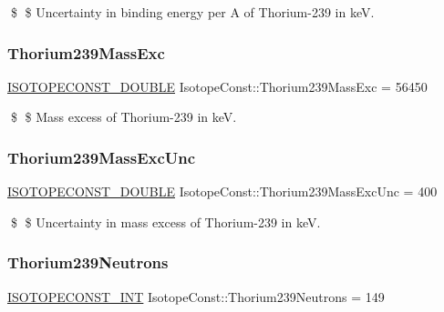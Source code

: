\$ \$ Uncertainty in binding energy per A of Thorium-\/239 in keV. \mbox{\label{group___isotope_const-_thorium-_th239_ga675bf0d62206a3635201f29ef69b56b9}} 
\subsubsection{\texorpdfstring{Thorium239\+Mass\+Exc}{Thorium239MassExc}}
{\footnotesize\ttfamily \mbox{\hyperlink{group___isotope_const-_macros_ga8f45a7272ce02c0b4c65c44636ed719a}{I\+S\+O\+T\+O\+P\+E\+C\+O\+N\+S\+T\+\_\+\+D\+O\+U\+B\+LE}} Isotope\+Const\+::\+Thorium239\+Mass\+Exc = 56450}

\$ \$ Mass excess of Thorium-\/239 in keV. \mbox{\label{group___isotope_const-_thorium-_th239_ga2cae89331a1855e22b6297618dca477a}} 
\subsubsection{\texorpdfstring{Thorium239\+Mass\+Exc\+Unc}{Thorium239MassExcUnc}}
{\footnotesize\ttfamily \mbox{\hyperlink{group___isotope_const-_macros_ga8f45a7272ce02c0b4c65c44636ed719a}{I\+S\+O\+T\+O\+P\+E\+C\+O\+N\+S\+T\+\_\+\+D\+O\+U\+B\+LE}} Isotope\+Const\+::\+Thorium239\+Mass\+Exc\+Unc = 400}

\$ \$ Uncertainty in mass excess of Thorium-\/239 in keV. \mbox{\label{group___isotope_const-_thorium-_th239_ga00d55f16829b11befe8dbb7f16db8caf}} 
\subsubsection{\texorpdfstring{Thorium239\+Neutrons}{Thorium239Neutrons}}
{\footnotesize\ttfamily \mbox{\hyperlink{group___isotope_const-_macros_ga5f18360b3e99483a35c32d789e62621c}{I\+S\+O\+T\+O\+P\+E\+C\+O\+N\+S\+T\+\_\+\+I\+NT}} Isotope\+Const\+::\+Thorium239\+Neutrons = 149}

